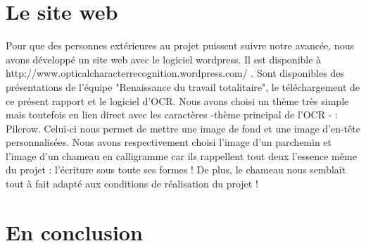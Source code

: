 \documentclass [french,12pt]{article}
\begin{document}
\section{Le site web}
Pour que des personnes extérieures au projet puissent suivre notre avancée, nous avons développé un site web avec le logiciel wordpress. Il est disponible à http://www.opticalcharacterrecognition.wordpress.com/ . Sont disponibles des présentations de l'équipe "Renaissance du travail totalitaire", le téléchargement de ce présent rapport et le logiciel d'OCR. Nous avons choisi un thème très simple mais toutefois en lien direct avec les caractères -thème principal de l'OCR - : Pilcrow. Celui-ci nous permet de mettre une image de fond et une image d'en-tête personnalisées. Nous avons respectivement choisi l'image d'un parchemin et l'image d'un chameau en calligramme car ils rappellent tout deux l'essence même du projet : l'écriture sous toute ses formes ! De plus, le chameau nous semblait tout à fait adapté aux conditions de réalisation du projet ! 


\section{En conclusion}
\end{document}
